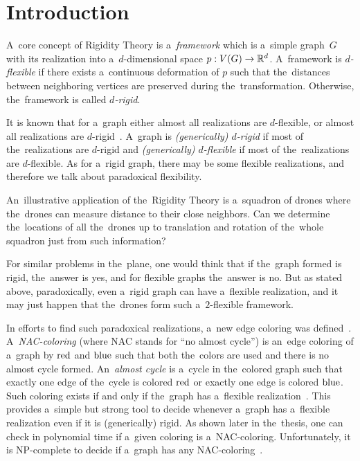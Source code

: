 
\chapter*{Introduction}
\setcounter{page}{1}


A~core concept of Rigidity Theory is a~\emph{framework} which is
a~simple graph~\(G\) with its realization
into a~\(d\)-dimensional space \(p: V(G) \to \mathbb{R}^d\).
A~framework is \emph{\( d \)-flexible} if there exists
a~continuous deformation of \( p \) such that
the~distances between neighboring vertices are preserved during the~transformation.
Otherwise, the~framework is called \emph{\( d \)-rigid}.

It is known that for a~graph either almost all realizations are \( d \)-flexible,
or almost all realizations are \( d \)-rigid~\cite{generically_rigid_graphs}.
A~graph is \emph{(generically) \( d \)-rigid} if most of the~realizations are \( d \)-rigid
and \emph{(generically) \( d \)-flexible} if most of the~realizations are \( d \)-flexible.
%
As for a~rigid graph,
there may be some flexible realizations,
and therefore we talk about paradoxical flexibility.

An~illustrative application of the~Rigidity Theory is a~squadron of drones
where the~drones can measure distance to their close neighbors.
Can we determine the~locations of all the~drones
up to translation and rotation of the~whole squadron
just from such information?

For similar problems in the~plane,
one would think that if the~graph formed is rigid, the~answer is yes, and
for flexible graphs the~answer is no.
But as stated above, paradoxically, even a~rigid graph can have a~flexible realization,
and it may just happen that the~drones form such a~\( 2 \)-flexible framework.

In efforts to find such paradoxical realizations,
a~new edge coloring was defined~\cite{legersky_original}.
A~\emph{NAC-coloring} (where NAC stands for ``no almost cycle'')
is an~edge coloring of a~graph by \( \text{red} \) and \( \text{blue} \)
such that both the~colors are used and there is no almost cycle formed.
An~\emph{almost cycle} is a~cycle in the~colored graph such that exactly one
edge of the~cycle is colored \( \text{red} \) or exactly one edge is colored \( \text{blue} \).
Such coloring exists if and only if the~graph has a~flexible realization~\cite{legersky_original}.
This provides a~simple but strong tool to decide whenever a~graph has
a~flexible realization even if it is (generically) rigid.
As shown later in the~thesis, one can check in polynomial time
if a~given coloring is a~NAC-coloring.
Unfortunately, it is NP-complete to decide if a~graph has any NAC-coloring~\cite{np_complete}.

